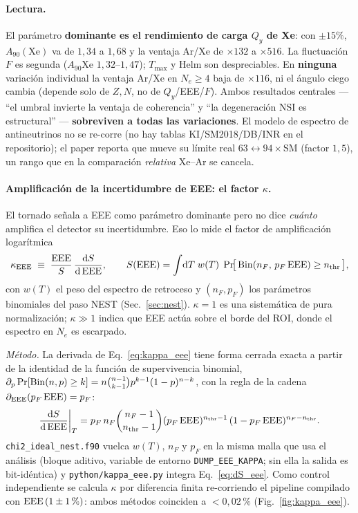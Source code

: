 \documentclass[11pt,a4paper]{article}
\newcommand{\Tnr}{T}
\newcommand{\Ne}{N_{e}}
\newcommand{\code}[1]{\texttt{#1}}
\newcommand{\dd}{\mathrm{d}}
\begin{document}
\paragraph{Lectura.} El par\'ametro \textbf{dominante es el rendimiento de carga
$Q_{y}$ de Xe}: con $\pm15\%$, $A_{90}(\text{Xe})$ va de $1{,}34$ a $1{,}68$ y la
ventaja Ar/Xe de $\times132$ a $\times516$. La fluctuaci\'on $F$ es segunda
($A_{90}$Xe $1{,}32$--$1{,}47$); $T_{\max}$ y Helm son despreciables. En
\textbf{ninguna} variaci\'on individual la ventaja Ar/Xe en $\Ne\ge4$ baja de
$\times116$, ni el \'angulo ciego cambia (depende solo de $Z,N$, no de
$Q_{y}$/EEE/$F$). Ambos resultados centrales --- ``el umbral invierte la ventaja
de coherencia'' y ``la degeneraci\'on NSI es estructural'' --- \textbf{sobreviven
a todas las variaciones}. El modelo de espectro de antineutrinos no se re-corre
(no hay tablas KI/SM2018/DB/INR en el repositorio); el paper reporta que mueve su
l\'imite real $63\leftrightarrow94\times$SM (factor $1{,}5$), un rango que en la
comparaci\'on \emph{relativa} Xe--Ar se cancela.

\paragraph{Amplificaci\'on de la incertidumbre de EEE: el factor $\kappa$.} El
tornado se\~nala a EEE como par\'ametro dominante pero no dice \emph{cu\'anto}
amplifica el detector su incertidumbre. Eso lo mide el factor de amplificaci\'on
logar\'itmica
\begin{equation}
  \label{eq:kappa_eee}
  \kappa_{\rm EEE} \;\equiv\; \frac{\rm EEE}{S}\,\frac{\dd S}{\dd\,{\rm EEE}},
  \qquad
  S({\rm EEE}) = \int\!\dd\Tnr\; w(\Tnr)\;
     \Pr\!\bigl[\,{\rm Bin}(n_{F},\,p_{F}\,{\rm EEE}) \ge n_{\rm thr}\,\bigr],
\end{equation}
con $w(\Tnr)$ el peso del espectro de retroceso y $(n_{F},p_{F})$ los par\'ametros
binomiales del paso NEST (Sec.~\ref{sec:nest}). $\kappa=1$ es una sistem\'atica de
pura normalizaci\'on; $\kappa\gg1$ indica que EEE act\'ua sobre el borde del ROI,
donde el espectro en $\Ne$ es escarpado.

\emph{M\'etodo.} La derivada de Eq.~\eqref{eq:kappa_eee} tiene forma cerrada
exacta a partir de la identidad de la funci\'on de supervivencia binomial,
$\partial_{p}\Pr[{\rm Bin}(n,p)\ge k] = n\binom{n-1}{k-1}p^{k-1}(1-p)^{n-k}$, con la
regla de la cadena $\partial_{\rm EEE}(p_{F}\,{\rm EEE})=p_{F}$:
\begin{equation}
  \label{eq:dS_eee}
  \frac{\dd S}{\dd\,{\rm EEE}}\bigg|_{\Tnr}
  = p_{F}\,n_{F}\binom{n_{F}-1}{n_{\rm thr}-1}
    (p_{F}\,{\rm EEE})^{n_{\rm thr}-1}\,(1-p_{F}\,{\rm EEE})^{n_{F}-n_{\rm thr}} .
\end{equation}
\code{chi2\_ideal\_nest.f90} vuelca $w(\Tnr)$, $n_{F}$ y $p_{F}$ en la misma malla
que usa el an\'alisis (bloque aditivo, variable de entorno \code{DUMP\_EEE\_KAPPA};
sin ella la salida es bit-id\'entica) y \code{python/kappa\_eee.py} integra
Eq.~\eqref{eq:dS_eee}. Como control independiente se calcula $\kappa$ por
diferencia finita re-corriendo el pipeline compilado con ${\rm EEE}\,(1\pm1\,\%)$:
ambos m\'etodos coinciden a $<0{,}02\,\%$ (Fig.~\ref{fig:kappa_eee}).
\end{document}
